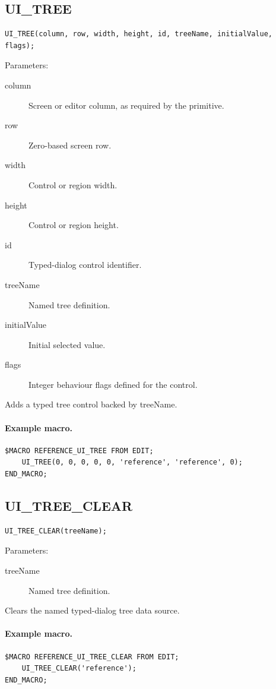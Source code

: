 \documentclass[a4paper,10pt,twoside,openany]{book}
\newenvironment{mrmacextension}{\begin{changebar}}{\end{changebar}}
\begin{document}
\begin{mrmacextension}
\label{prim:procedure-ui-tree}
\subsection*{UI\_TREE}
\begin{verbatim}
UI_TREE(column, row, width, height, id, treeName, initialValue, flags);
\end{verbatim}
Parameters:
\begin{description}
\item[column] Screen or editor column, as required by the primitive.
\item[row] Zero-based screen row.
\item[width] Control or region width.
\item[height] Control or region height.
\item[id] Typed-dialog control identifier.
\item[treeName] Named tree definition.
\item[initialValue] Initial selected value.
\item[flags] Integer behaviour flags defined for the control.
\end{description}

Adds a typed tree control backed by treeName.

\paragraph{Example macro.}
\begin{verbatim}
$MACRO REFERENCE_UI_TREE FROM EDIT;
    UI_TREE(0, 0, 0, 0, 0, 'reference', 'reference', 0);
END_MACRO;
\end{verbatim}
\end{mrmacextension}

\begin{mrmacextension}
\label{prim:procedure-ui-tree-clear}
\subsection*{UI\_TREE\_CLEAR}
\begin{verbatim}
UI_TREE_CLEAR(treeName);
\end{verbatim}
Parameters:
\begin{description}
\item[treeName] Named tree definition.
\end{description}

Clears the named typed-dialog tree data source.

\paragraph{Example macro.}
\begin{verbatim}
$MACRO REFERENCE_UI_TREE_CLEAR FROM EDIT;
    UI_TREE_CLEAR('reference');
END_MACRO;
\end{verbatim}
\end{mrmacextension}
\end{document}
